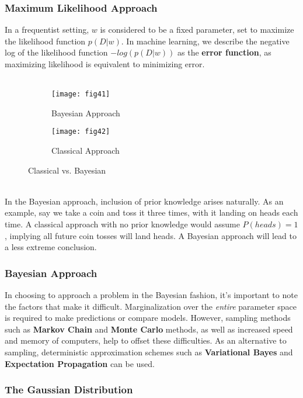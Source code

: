 \documentclass[11pt]{article} %
\begin{document}
\subsubsection{Maximum Likelihood Approach}

In a frequentist setting, $w$ is considered to be a fixed parameter, set to maximize the likelihood function $p(D|w)$. In machine learning, we describe the negative log of the likelihood function $-log(p(D|w))$ as the {\bf error function}, as maximizing likelihood is equivalent to minimizing error. \\
~\\
\begin{wrapfigure}{r}{0.5\textwidth}
	\centering
		\begin{subfigure}[t]{0.2\textwidth}
			\texttt{[image: fig41]}
			\caption{Bayesian Approach}
		\end{subfigure}
		\quad
		\begin{subfigure}[t]{0.2\textwidth}
			\texttt{[image: fig42]}
			\caption{Classical Approach}
		\end{subfigure}
	\caption{Classical vs. Bayesian}
\end{wrapfigure}
~\\
In the Bayesian approach, inclusion of prior knowledge arises naturally. As an example, say we take a coin and toss it three times, with it landing on heads each time. A classical approach with no prior knowledge would assume $P(heads) = 1$, implying all future coin tosses will land heads. A Bayesian approach will lead to a less extreme conclusion. \\

\subsubsection{Bayesian Approach}

In choosing to approach a problem in the Bayesian fashion, it's important to note the factors that make it difficult. Marginalization over the {\em entire} parameter space is required to make predictions or compare models. However, sampling methods such as {\bf Markov Chain} and {\bf Monte Carlo} methods, as well as increased speed and memory of computers, help to offset these difficulties. As an alternative to sampling, deterministic approximation schemes such as {\bf Variational Bayes} and {\bf Expectation Propagation} can be used.

\subsubsection{The Gaussian Distribution}
\end{document}
